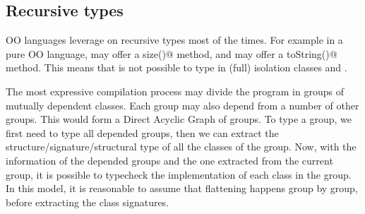  \subsection{Recursive types}

OO languages leverage on recursive types most of the times.
For example in a pure OO language, \Q@String@ may offer a \Q@Int size()@
method, and \Q@Int@ may offer a \Q@String toString()@ method.
This means that is not possible to type in (full) isolation classes
\Q@String@ and \Q@Int@.

The most expressive compilation process may divide the program in groups of mutually 
dependent classes.
Each group may also depend from a number of other groups.
This would form a Direct Acyclic Graph of groups.
To type a group, we first need to type all depended groups, then
we can extract the structure/signature/structural type of all
the classes of the group.
Now, with the information of the depended groups and the one extracted
from the current group, it is possible to typecheck the implementation
 of each class in the group.
In this model, it is reasonable to assume that flattening happens group by group, before
extracting the class signatures.

